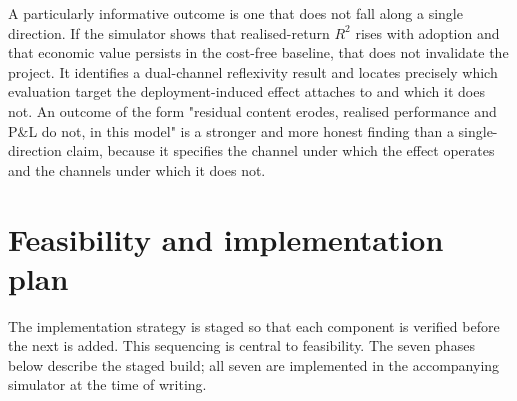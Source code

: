 \documentclass[11pt]{article}
\begin{document}
A particularly informative outcome is one that does not fall along a single direction. If the simulator shows that realised-return $R^{2}$ rises with adoption and that economic value persists in the cost-free baseline, that does not invalidate the project. It identifies a dual-channel reflexivity result and locates precisely which evaluation target the deployment-induced effect attaches to and which it does not. An outcome of the form "residual content erodes, realised performance and P\&L do not, in this model" is a stronger and more honest finding than a single-direction claim, because it specifies the channel under which the effect operates and the channels under which it does not.


\section{Feasibility and implementation plan}

The implementation strategy is staged so that each component is verified before the next is added. This sequencing is central to feasibility. The seven phases below describe the staged build; all seven are implemented in the accompanying simulator at the time of writing.
\end{document}
